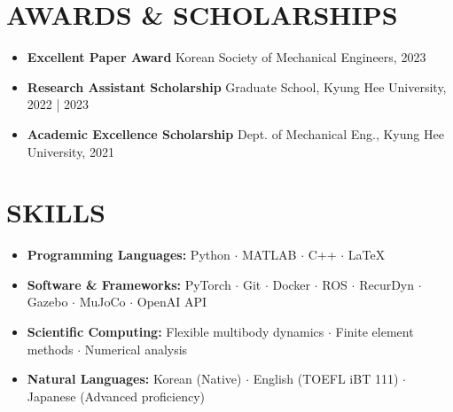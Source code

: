 \documentclass[a4paper,10pt]{extarticle}
\begin{document}

\section*{AWARDS \& SCHOLARSHIPS}
\begin{itemize}
	\item \textbf{Excellent Paper Award} \hfill Korean Society of Mechanical Engineers, 2023 %
	\item \textbf{Research Assistant Scholarship} \hfill Graduate School, Kyung Hee University, 2022 | 2023 %
	\item \textbf{Academic Excellence Scholarship} \hfill Dept. of Mechanical Eng., Kyung Hee University, 2021 %
\end{itemize}

\section*{SKILLS}
\begin{itemize}
	\item \textbf{Programming Languages: }Python $\cdot$ MATLAB $\cdot$ C++ $\cdot$ \LaTeX
	\item \textbf{Software \& Frameworks: }PyTorch $\cdot$ Git $\cdot$ Docker $\cdot$ ROS $\cdot$ RecurDyn $\cdot$ Gazebo $\cdot$ MuJoCo $\cdot$ OpenAI API
	\item \textbf{Scientific Computing: }Flexible multibody dynamics $\cdot$ Finite element methods $\cdot$ Numerical analysis
	\item \textbf{Natural Languages: }Korean (Native) $\cdot$ English (TOEFL iBT 111) $\cdot$ Japanese (Advanced proficiency)
\end{itemize}
\end{document}
